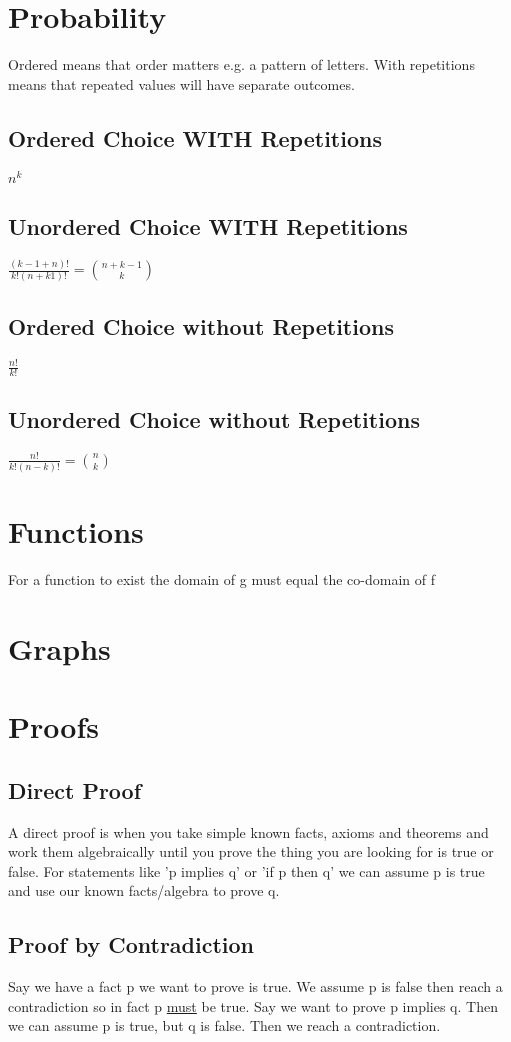 \documentclass[12pt] {article}
\begin{document}
\section*{Probability}
Ordered means that order matters e.g. a pattern of letters. With repetitions means that repeated values will have 
separate outcomes. 
\subsection*{Ordered Choice WITH Repetitions}
$n^k$
\subsection*{Unordered Choice WITH Repetitions}
$\frac{(k-1+n)!}{k!(n+k1)!} = {n + k -1 \choose k}$ 
\subsection*{Ordered Choice without Repetitions}
$\frac{n!}{k!}$
\subsection*{Unordered Choice without Repetitions}
$\frac{n!}{k!(n-k)!} = {n \choose k}$

\section*{Functions}
For a function to exist the domain of g must equal the co-domain of f

\section*{Graphs}

\section*{Proofs}
\subsection*{Direct Proof}
A direct proof is when you take simple known facts, axioms and theorems and 
work them algebraically until you prove the thing you are looking for is true or false.
For statements like 'p implies q' or 'if p then q' we can assume p is true and use 
our known facts/algebra to prove q.
\subsection*{Proof by Contradiction}
Say we have a fact p we want to prove is true. We assume p is false then reach
a contradiction so in fact p \underline{must} be true. Say we want to prove 
p implies q. Then we can assume p is true, but q is false. Then we reach a contradiction.
\end{document}
